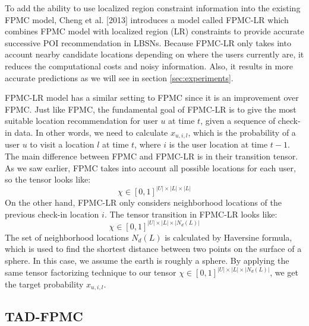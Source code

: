 \documentclass{sig-alternate}
\begin{document}
To add the ability to use localized region constraint 
information into the existing FPMC model, Cheng et al. [2013] 
introduces a model called FPMC-LR which combines FPMC model with localized 
region (LR) constraints to provide accurate successive POI recommendation in LBSNs. 
Because FPMC-LR only takes into account nearby candidate locations depending 
on where the users currently are, it reduces the computational costs and noisy information. 
Also, it results in more accurate predictions as we will see in section \ref{sec:experiments}.

FPMC-LR model has a similar setting to FPMC since it is an improvement 
over FPMC. Just like FPMC, the fundamental goal of FPMC-LR is to give the most suitable 
location recommendation for user $u$ at time $t$, given a sequence of check-in data. 
In other words, we need to calculate $x_{u,i,l}$, which is the probability of a user $u$ to visit a location $l$ at time $t$,
where $i$ is the user location at time $t-1$.
The main difference between FPMC and FPMC-LR is in their transition tensor. As we saw earlier, FPMC takes into account 
all possible locations for each user, so the tensor looks like: 
\begin{equation}
	\chi \in [0, 1]^{|U| \times |L| \times |L|}
\label{eq:summation}
\end{equation}
On the other hand, FPMC-LR only considers neighborhood locations of the previous check-in location $i$. 
The tensor transition in FPMC-LR looks like:
\begin{equation}
	\chi \in [0, 1]^{|U| \times |L| \times |N_d(L)|}
\label{eq:summation}
\end{equation}
The set of neighborhood locations \begin{math}N_d(L)\end{math} is calculated by Haversine formula, 
which is used to find the shortest distance between two points on the surface of a sphere. 
In this case, we assume the earth is roughly a sphere. By applying the same tensor factorizing technique to 
our tensor $\chi \in [0, 1]^{|U| \times |L| \times |N_d(L)|}$, we get the target probability $x_{u,i,l}$.

\subsection{TAD-FPMC}
\label{sec:typeChangesSpecialChars}
\end{document}

